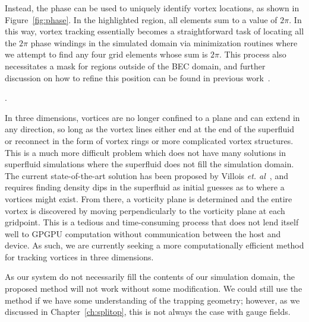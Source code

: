 Instead, the phase can be used to uniquely identify vortex locations, as shown in Figure~\ref{fig:phase}.
In the highlighted region, all elements sum to a value of $2\pi$.
In this way, vortex tracking essentially becomes a straightforward task of locating all the $2\pi$ phase windings in the simulated domain via minimization routines where we attempt to find any four grid elements whose sum is $2\pi$.
This process also necessitates a mask for regions outside of the BEC domain, and 
further discussion on how to refine this position can be found in previous work~\cite{o2017, docs}.

.

In three dimensions, vortices are no longer confined to a plane and can extend in any direction, so long as the vortex lines either end at the end of the superfluid or reconnect in the form of vortex rings or more complicated vortex structures.
This is a much more difficult problem which does not have many solutions in superfluid simulations where the superfluid does not fill the simulation domain.
The current state-of-the-art solution has been proposed by Villois \textit{et. al}~\cite{villois2016}, and requires finding density dips in the superfluid as initial guesses as to where a vortices might exist.
From there, a vorticity plane is determined and the entire vortex is discovered by moving perpendicularly to the vorticity plane at each gridpoint.
This is a tedious and time-consuming process that does not lend itself well to GPGPU computation without communication between the host and device.
As such, we are currently seeking a more computationally efficient method for tracking vortices in three dimensions.

As our system do not necessarily fill the contents of our simulation domain, the proposed method will not work without some modification.
We could still use the method if we have some understanding of the trapping geometry; however, as we discussed in Chapter~\ref{ch:splitop}, this is not always the case with gauge fields.

